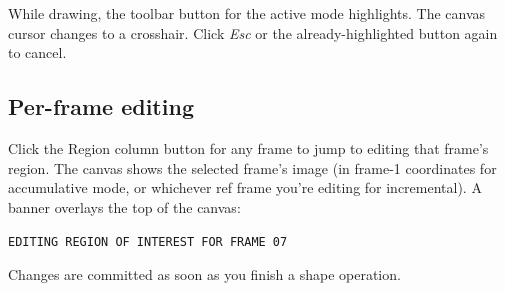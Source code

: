 While drawing, the toolbar button for the active mode highlights.
The canvas cursor changes to a crosshair. Click \emph{Esc} or the
already-highlighted button again to cancel.

\subsection{Per-frame editing}

Click the Region column button for any frame to jump to editing that
frame's region. The canvas shows the selected frame's image (in
frame-1 coordinates for accumulative mode, or whichever ref frame
you're editing for incremental). A banner overlays the top of the
canvas:

\begin{center}
  \texttt{EDITING REGION OF INTEREST FOR FRAME 07}
\end{center}

Changes are committed as soon as you finish a shape operation.
